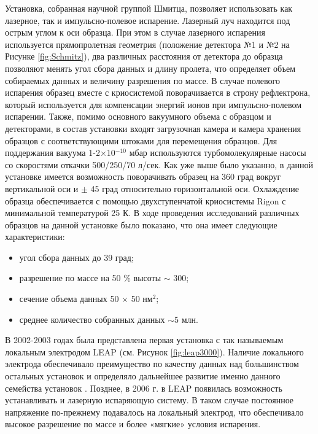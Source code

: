 Установка, собранная научной группой Шмитца, позволяет использовать как лазерное, так и импульсно-полевое испарение. Лазерный луч находится под острым углом к оси образца. При этом в случае лазерного испарения используется прямопролетная геометрия (положение детектора №1 и №2 на Рисунке \cref{fig:Schmitz}), два различных расстояния от детектора до образца позволяют менять угол сбора данных и длину пролета, что определяет объем собираемых данных и величину разрешения по массе. В случае полевого испарения образец вместе с криосистемой поворачивается в строну рефлектрона, который используется для компенсации энергий ионов при импульсно-полевом испарении. Также, помимо основного вакуумного объема с образцом и детекторами, в состав установки входят загрузочная камера и камера хранения образцов с соответствующими штоками для перемещения образцов. Для поддержания вакуума 1-2×10$^{-10}$ мбар используются турбомолекулярные насосы со скоростями откачки 500/250/70 л/сек. Как уже выше было указанно, в данной установке имеется возможность поворачивать образец на 360 град вокруг вертикальной оси и $\pm$ 45 град относительно горизонтальной оси. Охлаждение образца обеспечивается с помощью двухступенчатой криосистемы Rigon с минимальной температурой 25 К. В ходе проведения исследований различных образцов на данной установке было показано, что она имеет следующие характеристики:
\begin{itemize}[beginpenalty=10000] %
	\item угол сбора данных до 39 град;
	\item разрешение по массе на 50 \% высоты $\sim$ 300;
	\item сечение объема данных 50 × 50 нм$^{2}$;
	\item среднее количество собранных данных $\sim$5 млн.
\end{itemize}	

В 2002-2003 годах была представлена первая установка с так называемым локальным электродом LEAP (см. Рисунок \cref{fig:leap3000}). Наличие локального электрода обеспечивало преимущество по качеству данных над большинством остальных установок и определяло дальнейшее развитие именно данного семейства установок \cite{Kelly00}. Позднее, в 2006 г. в LEAP появилась возможность устанавливать и лазерную испаряющую систему. В таком случае постоянное напряжение по-прежнему подавалось на локальный электрод, что обеспечивало высокое разрешение по массе и более «мягкие» условия испарения.

